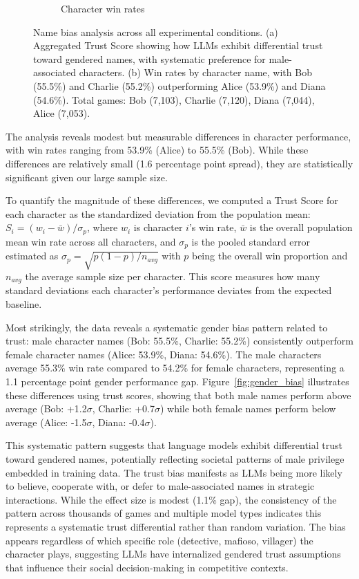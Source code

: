 \documentclass{article}
\begin{document}
\begin{figure}[h!]
\begin{subfigure}[b]{0.49\textwidth}
    \caption{Character win rates}
    \label{fig:character_winrates}
\end{subfigure}
\caption{Name bias analysis across all experimental conditions. (a) Aggregated Trust Score showing how LLMs exhibit differential trust toward gendered names, with systematic preference for male-associated characters. (b) Win rates by character name, with Bob (55.5\%) and Charlie (55.2\%) outperforming Alice (53.9\%) and Diana (54.6\%). Total games: Bob (7,103), Charlie (7,120), Diana (7,044), Alice (7,053).}
\label{fig:name_bias}
\end{figure}

The analysis reveals modest but measurable differences in character performance, with win rates ranging from 53.9\% (Alice) to 55.5\% (Bob). While these differences are relatively small (1.6 percentage point spread), they are statistically significant given our large sample size. 

To quantify the magnitude of these differences, we computed a Trust Score for each character as the standardized deviation from the population mean: $S_i = (w_i - \bar{w}) / \sigma_p$, where $w_i$ is character $i$'s win rate, $\bar{w}$ is the overall population mean win rate across all characters, and $\sigma_p$ is the pooled standard error estimated as $\sigma_p = \sqrt{p(1-p)/n_{avg}}$ with $p$ being the overall win proportion and $n_{avg}$ the average sample size per character. This score measures how many standard deviations each character's performance deviates from the expected baseline.

Most strikingly, the data reveals a systematic gender bias pattern related to trust: male character names (Bob: 55.5\%, Charlie: 55.2\%) consistently outperform female character names (Alice: 53.9\%, Diana: 54.6\%). The male characters average 55.3\% win rate compared to 54.2\% for female characters, representing a 1.1 percentage point gender performance gap. Figure~\ref{fig:gender_bias} illustrates these differences using trust scores, showing that both male names perform above average (Bob: +1.2$\sigma$, Charlie: +0.7$\sigma$) while both female names perform below average (Alice: -1.5$\sigma$, Diana: -0.4$\sigma$).

This systematic pattern suggests that language models exhibit differential trust toward gendered names, potentially reflecting societal patterns of male privilege embedded in training data. The trust bias manifests as LLMs being more likely to believe, cooperate with, or defer to male-associated names in strategic interactions. While the effect size is modest (1.1\% gap), the consistency of the pattern across thousands of games and multiple model types indicates this represents a systematic trust differential rather than random variation. The bias appears regardless of which specific role (detective, mafioso, villager) the character plays, suggesting LLMs have internalized gendered trust assumptions that influence their social decision-making in competitive contexts.
\end{document}
